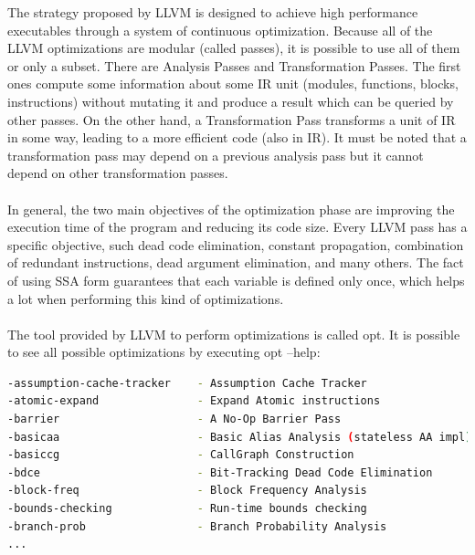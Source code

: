 \documentclass[12pt,a4paper,oneside]{article}
\begin{document}
The strategy proposed by LLVM is designed to achieve high performance executables
through a system of continuous optimization. Because all of the LLVM
optimizations are modular (called passes), it is possible to use all of them
or only a subset. There are Analysis Passes and Transformation Passes. The first
ones compute some information about some IR unit (modules, functions, blocks,
instructions) without mutating it and produce a result which can be queried
by other passes. On the other hand, a Transformation Pass transforms a unit of
IR in some way, leading to a more efficient code (also in IR). It must be noted
that a transformation pass  may depend on a previous analysis pass but it cannot
depend on other transformation passes.\\\\
In general, the two main objectives of the optimization phase are improving the
execution time of the program and reducing its code size. Every LLVM pass has a
specific objective, such dead code elimination, constant propagation, combination
of redundant instructions, dead argument elimination, and many others. The fact
of using SSA form guarantees that each variable is defined only once, which helps
a lot when performing this kind of optimizations.\\\\
The tool provided by LLVM to perform optimizations is called
{\selectfont opt}. It is possible to see all possible optimizations
by executing {\selectfont opt --help}:
\begin{lstlisting}[language=sh,caption={},captionpos=b,keywords={}]
-assumption-cache-tracker    - Assumption Cache Tracker
-atomic-expand               - Expand Atomic instructions
-barrier                     - A No-Op Barrier Pass
-basicaa                     - Basic Alias Analysis (stateless AA impl)
-basiccg                     - CallGraph Construction
-bdce                        - Bit-Tracking Dead Code Elimination
-block-freq                  - Block Frequency Analysis
-bounds-checking             - Run-time bounds checking
-branch-prob                 - Branch Probability Analysis
...
\end{lstlisting}
\end{document}
